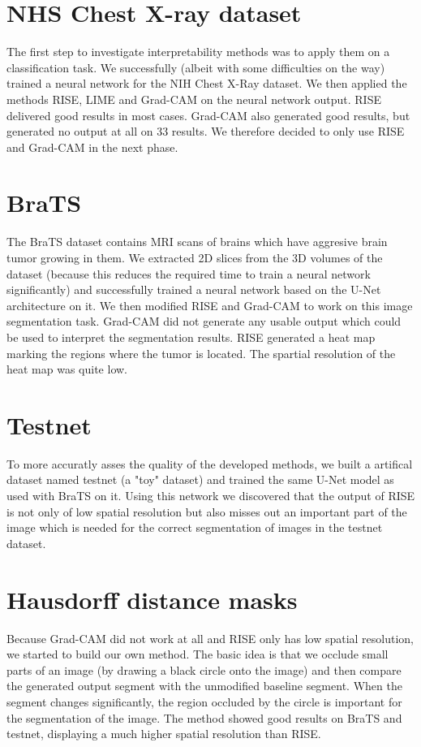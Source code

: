 \section{NHS Chest X-ray dataset}
The first step to investigate interpretability methods was to apply them on a classification task.
We successfully (albeit with some difficulties on the way) trained a neural network for the NIH Chest X-Ray dataset.
We then applied the methods RISE, LIME and Grad-CAM on the neural network output. RISE delivered good results in most cases. Grad-CAM also generated good results, but generated no output at all on 33%
results. We therefore decided to only use RISE and Grad-CAM in the next phase.

\section{BraTS}
The BraTS dataset contains MRI scans of brains which have aggresive brain tumor growing in them. We extracted 2D slices from the 3D volumes of the dataset (because this reduces the required time to train a neural network significantly) and successfully trained a neural network based on the U-Net architecture on it. We then modified RISE and Grad-CAM to work on this image segmentation task. Grad-CAM did not generate any usable output which could be used to interpret the segmentation results. RISE generated a heat map marking the regions where the tumor is located. The spartial resolution of the heat map was quite low.

\section{Testnet}
To more accuratly asses the quality of the developed methods, we built a artifical dataset named testnet (a "toy" dataset) and trained the same U-Net model as used with BraTS on it. Using this network we discovered that the output of RISE is not only of low spatial resolution but also misses out an important part of the image which is needed for the correct segmentation of images in the testnet dataset.

\section{Hausdorff distance masks}
Because Grad-CAM did not work at all and RISE only has low spatial resolution, we started to build our own method. 
The basic idea is that we occlude small parts of an image (by drawing a black circle onto the image) and then compare the generated output segment with the unmodified baseline segment. When the segment changes significantly, the region occluded by the circle is important for the segmentation of the image.
The method showed good results on BraTS and testnet, displaying a much higher spatial resolution than RISE.

